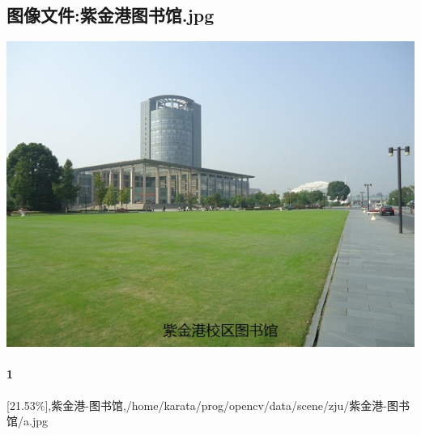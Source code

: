 \subsection{图像文件:紫金港图书馆.jpg}
\includegraphics[width=15cm,angle=0]{紫金港图书馆.jpg}

\paragraph{1}
[21.53\%],紫金港-图书馆,/home/karata/prog/opencv/data/scene/zju/紫金港-图书馆/a.jpg

